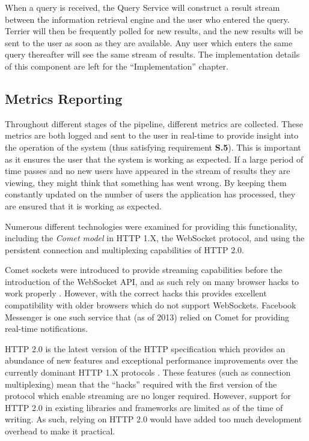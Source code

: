 \documentclass{l4proj}
\begin{document}
        When a query is received, the Query Service will construct a result stream between the information retrieval engine and the user who entered the query. Terrier will then be frequently polled for new results, and the new results will be sent to the user as soon as they are available. Any user which enters the same query thereafter will see the same stream of results. The implementation details of this component are left for the ``Implementation'' chapter.
              
        \subsection{Metrics Reporting}
        Throughout different stages of the pipeline, different metrics are collected. These metrics are both logged and sent to the user in real-time to provide insight into the operation of the system (thus satisfying requirement \textbf{S.5}). This is important as it ensures the user that the system is working as expected. If a large period of time passes and no new users have appeared in the stream of results they are viewing, they might think that something has went wrong. By keeping them constantly updated on the number of users the application has processed, they are ensured that it is working as expected.
        
        Numerous different technologies were examined for providing this functionality, including the \textit{Comet model} in HTTP 1.X, the WebSocket protocol, and using the persistent connection and multiplexing capabilities of HTTP 2.0.
        
        Comet sockets were introduced to provide streaming capabilities before the introduction of the WebSocket API, and as such rely on many browser hacks to work properly \cite{comet}. However, with the correct hacks this provides excellent compatibility with older browsers which do not support WebSockets. Facebook Messenger is one such service that (as of 2013) relied on Comet for providing real-time notifications.
        
        HTTP 2.0 is the latest version of the HTTP specification which provides an abundance of new features and exceptional performance improvements over the currently dominant HTTP 1.X protocols \cite{http2}. These features (such as connection multiplexing) mean that the ``hacks'' required with the first version of the protocol which enable streaming are no longer required. However, support for HTTP 2.0 in existing libraries and frameworks are limited as of the time of writing. As such, relying on HTTP 2.0 would have added too much development overhead to make it practical.    
        
\end{document}
